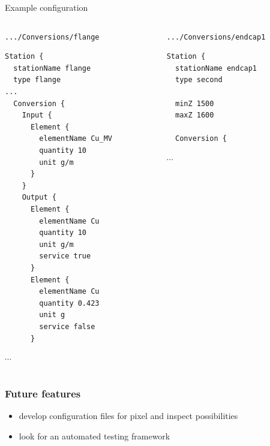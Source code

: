 \documentclass[pdftex, 11pt]{beamer}
\newcommand{\pat}[1]{\texttt{#1}}
\begin{document}
\begin{frame}[fragile]{Example configuration}
  \tiny
  \begin{columns}[t]
    \begin{column}{0.47\textwidth}
      \begin{block}{\pat{.../Conversions/flange}}
\begin{verbatim}
Station {
  stationName flange
  type flange
...
  Conversion {
    Input {
      Element {
        elementName Cu_MV
        quantity 10
        unit g/m
      }
    }
    Output {
      Element {
        elementName Cu
        quantity 10
        unit g/m
        service true
      }
      Element {
        elementName Cu
        quantity 0.423
        unit g
        service false
      }
\end{verbatim}
$\cdots$
      \end{block}
    \end{column}
    \begin{column}{0.47\textwidth}
      \begin{block}{\pat{.../Conversions/endcap1}}
\begin{verbatim}
Station {
  stationName endcap1
  type second

  minZ 1500
  maxZ 1600

  Conversion {
\end{verbatim}
$\cdots$
      \end{block}
    \end{column}
  \end{columns}
\end{frame}

\begin{frame}
  \frametitle{Future features}
  \begin{itemize}
  \item develop configuration files for \alert{pixel} and
    \alert{inspect} possibilities
  \item look for an automated testing framework
  \end{itemize}
\end{frame}
\end{document}
